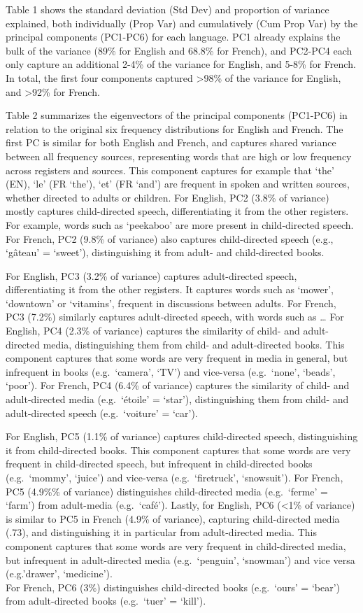 \documentclass[10pt, letterpaper]{article}
\begin{document}
Table 1 shows the standard deviation (Std Dev) and proportion of
variance explained, both individually (Prop Var) and cumulatively (Cum
Prop Var) by the principal components (PC1-PC6) for each language. PC1
already explains the bulk of the variance (89\% for English and 68.8\%
for French), and PC2-PC4 each only capture an additional 2-4\% of the
variance for English, and 5-8\% for French. In total, the first four
components captured \textgreater98\% of the variance for English, and
\textgreater92\% for French.

Table 2 summarizes the eigenvectors of the principal components
(PC1-PC6) in relation to the original six frequency distributions for
English and French. The first PC is similar for both English and French,
and captures shared variance between all frequency sources, representing
words that are high or low frequency across registers and sources. This
component captures for example that `the' (EN), `le' (FR `the'), `et'
(FR `and') are frequent in spoken and written sources, whether directed
to adults or children. For English, PC2 (3.8\% of variance) mostly
captures child-directed speech, differentiating it from the other
registers. For example, words such as `peekaboo' are more present in
child-directed speech. For French, PC2 (9.8\% of variance) also captures
child-directed speech (e.g., `gâteau' = `sweet'), distinguishing it from
adult- and child-directed books.

For English, PC3 (3.2\% of variance) captures adult-directed speech,
differentiating it from the other registers. It captures words such as
`mower', `downtown' or `vitamins', frequent in discussions between
adults. For French, PC3 (7.2\%) similarly captures adult-directed
speech, with words such as \ldots{} For English, PC4 (2.3\% of variance)
captures the similarity of child- and adult-directed media,
distinguishing them from child- and adult-directed books. This component
captures that some words are very frequent in media in general, but
infrequent in books (e.g.~`camera', `TV') and vice-versa (e.g.~`none',
`beads', `poor'). For French, PC4 (6.4\% of variance) captures the
similarity of child- and adult-directed media (e.g.~`étoile' = `star'),
distinguishing them from child- and adult-directed speech
(e.g.~`voiture' = `car').

For English, PC5 (1.1\% of variance) captures child-directed speech,
distinguishing it from child-directed books. This component captures
that some words are very frequent in child-directed speech, but
infrequent in child-directed books (e.g.~`mommy', `juice') and
vice-versa (e.g.~`firetruck', `snowsuit'). For French, PC5 (4.9\%\% of
variance) distinguishes child-directed media (e.g.~`ferme' = `farm')
from adult-media (e.g.~`café'). Lastly, for English, PC6 (\textless1\%
of variance) is similar to PC5 in French (4.9\% of variance), capturing
child-directed media (.73), and distinguishing it in particular from
adult-directed media. This component captures that some words are very
frequent in child-directed media, but infrequent in adult-directed media
(e.g.~`penguin', `snowman') and vice versa (e.g.'drawer', `medicine').\\
For French, PC6 (3\%) distinguishes child-directed books (e.g.~`ours' =
`bear') from adult-directed books (e.g.~`tuer' = `kill').
\end{document}
